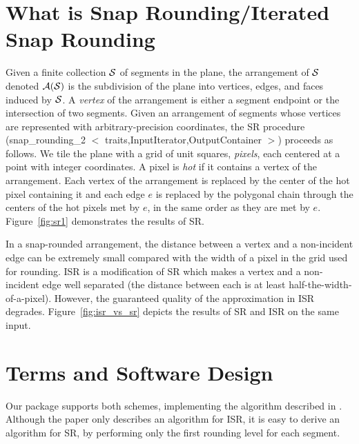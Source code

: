 \section{What is Snap Rounding/Iterated Snap Rounding}
Given a finite collection $\S$ of segments in the plane, the
arrangement of $\S$ denoted $\A(\S)$ is the subdivision of the plane
into vertices, edges, and faces induced by $\S$. %
A {\it vertex\/} of the arrangement is either a segment endpoint or
the intersection of two segments. Given an arrangement of segments
whose vertices are represented with arbitrary-precision coordinates,
the SR procedure
(snap\_rounding\_2 $<$ traits,InputIterator,OutputContainer $>$)
proceeds as follows.  We tile the plane
with a grid of unit squares, {\it pixels}, each centered at a point
with integer coordinates. A pixel is {\it hot\/} if it contains a
vertex of the arrangement. Each vertex of the arrangement is replaced
by the center of the hot pixel containing it and each edge $e$ is
replaced by the polygonal chain through the centers of the hot pixels
met by $e$, in the same order as they are met by $e$. 
Figure~\ref{fig:sr1} demonstrates the results of SR.

In a snap-rounded arrangement, the distance between a vertex and
a non-incident edge can be extremely small compared with the width of a
pixel in the grid used for rounding. ISR
is a modification of SR which makes a vertex and a
non-incident edge well separated (the distance between each is at least
half-the-width-of-a-pixel). However, the guaranteed quality of the
approximation in ISR degrades. Figure~\ref{fig:isr_vs_sr} depicts
the results of SR and ISR on the same input.

\section{Terms and Software Design}

Our package supports both schemes, implementing the algorithm
described in \cite{cgal:hp-isr-02}.
Although the paper only describes an algorithm for ISR,
it is easy to derive an algorithm for SR, by performing only
the first rounding level for each segment.

